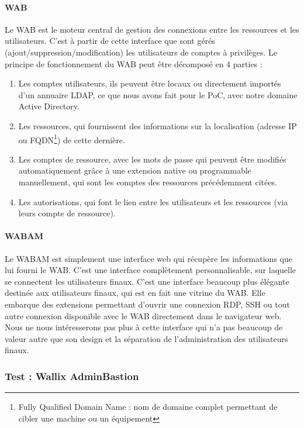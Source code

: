 \paragraph{WAB}
Le WAB est le moteur central de gestion des connexions entre les ressources et les utilisateurs. C'est à partir de cette interface que sont gérés (ajout/suppression/modification) les utilisateurs de comptes à privilèges. Le principe de fonctionnement du WAB peut être décomposé en 4 parties :
\begin{enumerate}
	\item Les comptes utilisateurs, ils peuvent être locaux ou directement importés d'un annuaire LDAP, ce que nous avons fait pour le PoC, avec notre domaine Active Directory.
	\item Les ressources, qui fournissent des informations sur la localisation (adresse IP ou FQDN\footnote{Fully Qualified Domain Name : nom de domaine complet permettant de cibler une machine ou un équipement}) de cette dernière.
	\item Les comptes de ressource, avec les mots de passe qui peuvent être modifiés automatiquement grâce à une extension native ou programmable manuellement, qui sont les comptes des ressources précédemment citées.
	\item Les autorisations, qui font le lien entre les utilisateurs et les ressources (via leurs compte de ressource).
\end{enumerate}

\paragraph{WABAM}
Le WABAM est simplement une interface web qui récupère les informations que lui fourni le WAB. C'est une interface complètement personnalisable, sur laquelle se connectent les utilisateurs finaux. C'est une interface beaucoup plus élégante destinée aux utilisateurs finaux, qui est en fait une vitrine du WAB. Elle embarque des extensions permettant d'ouvrir une connexion RDP, SSH ou tout autre connexion disponible avec le WAB directement dans le navigateur web. Nous ne nous intéresserons pas plus à cette interface qui n'a pas beaucoup de valeur autre que son design et la séparation de l'administration des utilisateurs finaux.

\subsubsection{Test : Wallix AdminBastion}
\label{par:testwallix}

